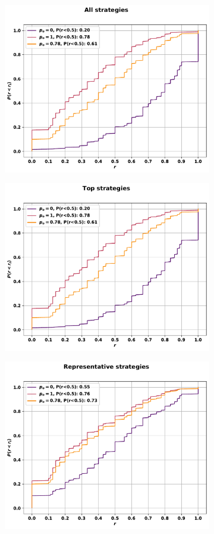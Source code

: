 \begin{figure}[!htbp]
    \begin{subfigure}{.5\textwidth}
    \centering
    \includegraphics[width=.75\textwidth]{src/chapters/07/img/cfd_to_probability_all_strategies.pdf}
    \end{subfigure}\hfill
    \begin{subfigure}{.5\textwidth}
    \centering
    \includegraphics[width=.75\textwidth]{src/chapters/07/img/cfd_to_probability_top_strategies.pdf}
    \end{subfigure}
    \begin{subfigure}{.5\textwidth}
    \centering
    \includegraphics[width=.75\textwidth]{src/chapters/07/img/cfd_to_probability_representative_strategies.pdf}

\end{subfigure}
\end{figure}
